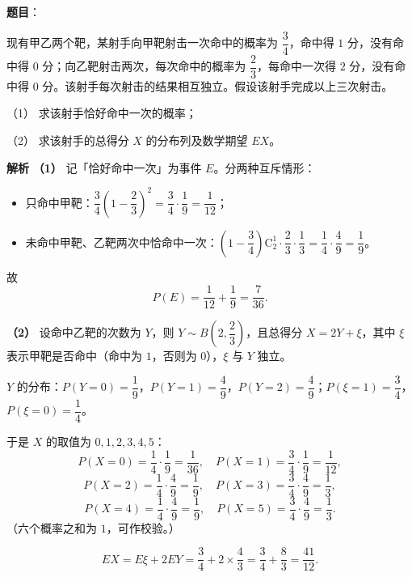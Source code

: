 \begin{answer}

\textbf{题目}：

现有甲乙两个靶，某射手向甲靶射击一次命中的概率为 $\dfrac34$，命中得 $1$ 分，没有命中得 $0$ 分；向乙靶射击两次，每次命中的概率为 $\dfrac23$，每命中一次得 $2$ 分，没有命中得 $0$ 分。该射手每次射击的结果相互独立。假设该射手完成以上三次射击。

（1） 求该射手恰好命中一次的概率；

（2） 求该射手的总得分 $X$ 的分布列及数学期望 $EX$。

\textbf{解析}
\textbf{（1）} 记「恰好命中一次」为事件 $E$。分两种互斥情形：
\begin{itemize}
\item 只命中甲靶：$\dfrac34\left(1-\dfrac23\right)^2=\dfrac34\cdot\dfrac19=\dfrac1{12}$；
\item 未命中甲靶、乙靶两次中恰命中一次：$\left(1-\dfrac34\right)\mathrm C_2^1\cdot\dfrac23\cdot\dfrac13=\dfrac14\cdot\dfrac49=\dfrac19$。
\end{itemize}

故
\nopagebreak[4]
\[P(E)=\frac1{12}+\frac19=\frac7{36}.\]

\textbf{（2）} 设命中乙靶的次数为 $Y$，则 $Y\sim B\left(2,\dfrac23\right)$，且总得分 $X=2Y+\xi$，其中 $\xi$ 表示甲靶是否命中（命中为 $1$，否则为 $0$），$\xi$ 与 $Y$ 独立。

$Y$ 的分布：$P(Y=0)=\dfrac19$，$P(Y=1)=\dfrac49$，$P(Y=2)=\dfrac49$；$P(\xi=1)=\dfrac34$，$P(\xi=0)=\dfrac14$。

于是 $X$ 的取值为 $0,1,2,3,4,5$：
\nopagebreak[4]
\[P(X=0)=\frac14\cdot\frac19=\frac1{36},\quad P(X=1)=\frac34\cdot\frac19=\frac1{12},\]
\nopagebreak[4]
\[P(X=2)=\frac14\cdot\frac49=\frac19,\quad P(X=3)=\frac34\cdot\frac49=\frac13,\]
\nopagebreak[4]
\[P(X=4)=\frac14\cdot\frac49=\frac19,\quad P(X=5)=\frac34\cdot\frac49=\frac13.\]
（六个概率之和为 $1$，可作校验。）

\nopagebreak[4]
\[EX=E\xi+2EY=\frac34+2\times\frac43=\frac34+\frac83=\frac{41}{12}.\]



\end{answer}
